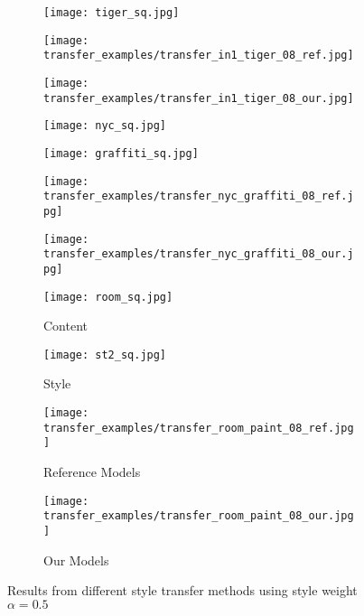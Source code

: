 \begin{figure}[H]
\begin{subfigure}[b]{0.225\linewidth}
	\end{subfigure}
	\begin{subfigure}[b]{0.225\linewidth}
		\texttt{[image: tiger\_sq.jpg]} %
	\end{subfigure}
	\begin{subfigure}[b]{0.225\linewidth}
		\texttt{[image: transfer\_examples/transfer\_in1\_tiger\_08\_ref.jpg]} %
	\end{subfigure}
	\begin{subfigure}[b]{0.225\linewidth}
		\texttt{[image: transfer\_examples/transfer\_in1\_tiger\_08\_our.jpg]} %
	\end{subfigure}
	\centering
	\begin{subfigure}[b]{0.225\linewidth}
		\texttt{[image: nyc\_sq.jpg]} %
	\end{subfigure}
	\begin{subfigure}[b]{0.225\linewidth}
		\texttt{[image: graffiti\_sq.jpg]} %
	\end{subfigure}
	\begin{subfigure}[b]{0.225\linewidth}
		\texttt{[image: transfer\_examples/transfer\_nyc\_graffiti\_08\_ref.jpg]} %
	\end{subfigure}
	\begin{subfigure}[b]{0.225\linewidth}
		\texttt{[image: transfer\_examples/transfer\_nyc\_graffiti\_08\_our.jpg]} %
	\end{subfigure}
	\centering
	\begin{subfigure}[b]{0.225\linewidth}
		\texttt{[image: room\_sq.jpg]} %
		\caption{Content}
	\end{subfigure}
	\begin{subfigure}[b]{0.225\linewidth}
		\texttt{[image: st2\_sq.jpg]} %
		\caption{Style}
	\end{subfigure}
	\begin{subfigure}[b]{0.225\linewidth}
		\texttt{[image: transfer\_examples/transfer\_room\_paint\_08\_ref.jpg]} %
		\caption{Reference Models}
	\end{subfigure}
	\begin{subfigure}[b]{0.225\linewidth}
		\texttt{[image: transfer\_examples/transfer\_room\_paint\_08\_our.jpg]} %
		\caption{Our Models}
	\end{subfigure}
	\caption{Results from different style transfer methods using style weight $\alpha=0.5$}
	\label{fig:style_transfer}
\end{figure}
